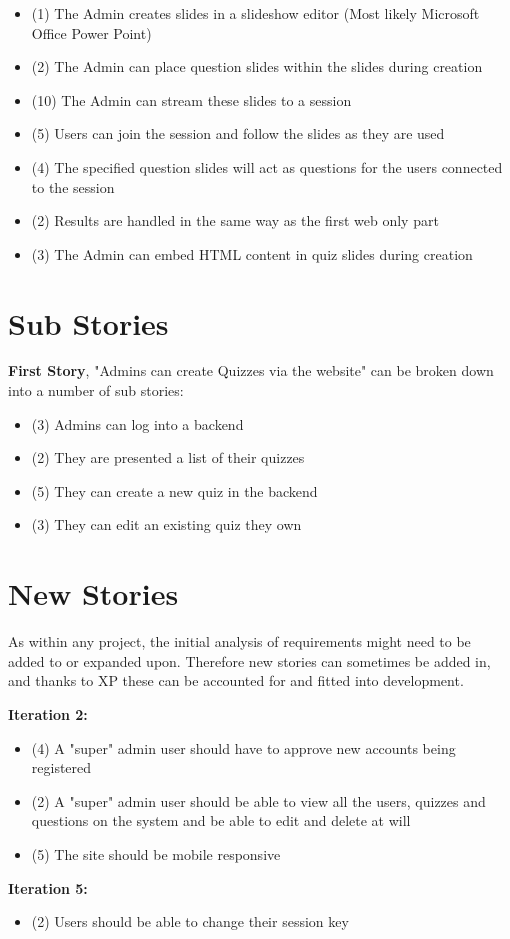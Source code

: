\documentclass{article}
\begin{document}
\begin{itemize}
	\item (1) The Admin creates slides in a slideshow editor (Most likely Microsoft Office Power Point)
	\item (2) The Admin can place question slides within the slides during creation
	\item (10) The Admin can stream these slides to a session
	\item (5) Users can join the session and follow the slides as they are used	
	\item (4) The specified question slides will act as questions for the users connected to the session
	\item (2) Results are handled in the same way as the first web only part
	\item (3) The Admin can embed HTML content in quiz slides during creation
\end{itemize}
\newpage

\section{Sub Stories}
\textbf{First Story}, "Admins can create Quizzes via the website" can be broken down into a number of sub stories:
\begin{itemize}
	\item (3) Admins can log into a backend
	\item (2) They are presented a list of their quizzes
	\item (5) They can create a new quiz in the backend
	\item (3) They can edit an existing quiz they own
\end{itemize}
\newpage

\section{New Stories}
As within any project, the initial analysis of requirements might need to be added to or expanded upon. Therefore new stories can sometimes be added in, and thanks to XP these can be accounted for and fitted into development.

\textbf{Iteration 2:}
\begin{itemize}
	\item (4) A "super" admin user should have to approve new accounts being registered
	\item (2) A "super" admin user should be able to view all the users, quizzes and questions on the system and be able to edit and delete at will
	\item (5) The site should be mobile responsive
\end{itemize}
\textbf{Iteration 5:}
\begin{itemize}
	\item (2) Users should be able to change their session key
\end{itemize}
\end{document}
